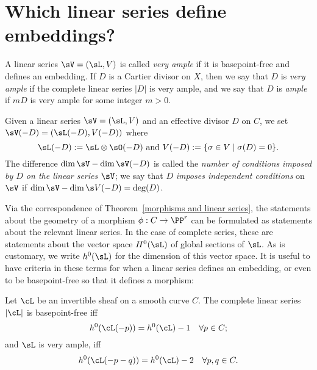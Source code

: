 \section{Which linear series define embeddings?}

A linear series $\sV = (\sL, V)$ is called  \emph{very ample}  if it is basepoint-free and defines an embedding. If $D$ is a Cartier divisor on $X$, then we say that $D$ is \emph{very ample} if the complete linear series $|D|$ is very ample, and we say that $D$ is \emph{ample} if $mD$ is very ample for some integer $m>0$.

Given a linear series $\sV = (\sL, V)$ and an effective divisor $D$ on $C$, we  set
$
\sV(-D) = (\sL(-D),V(-D))
$
where
$$
\sL(-D): = \sL \otimes \sO(-D)\hbox{ and } V(-D) := \{ \sigma \in V \mid \sigma(D) = 0 \}.
$$
The difference $\dim \sV - \dim \sV(-D)$ is called the \emph{number of conditions imposed by $D$ on the linear series $\sV$}; we say that $D$ \emph{imposes independent conditions} on $\sV$ if $\dim \sV - \dim \s V(-D) = \deg(D)$.

Via the correspondence of Theorem~\ref{morphisms and linear series}, the statements about the geometry of a morphism $\phi : C \to \PP^r$ can be formulated as statements about the relevant linear series. In the case of complete series, these are statements about the vector space $H^{0}(\sL)$ of global sections of $\sL$. As is customary, we write $h^{0}(\sL)$ for the dimension of this vector space. It is useful to have criteria
in these terms for when a linear series defines an embedding, or even to be basepoint-free so that it
defines a morphism:

\begin{proposition}\label{very ample}\cite[Thm. IV.3.1]{H}
Let $\cL$ be an invertible sheaf on a smooth curve $C$. The complete linear series $|\cL|$ is basepoint-free iff
$$
h^0(\cL(-p)) = h^0(\cL) - 1 \quad \forall p \in C;
$$
and $\sL$ is very ample, iff
$$
h^0(\cL(-p-q)) = h^0(\cL) - 2 \quad \forall p, q \in C.
$$
\end{proposition} 

